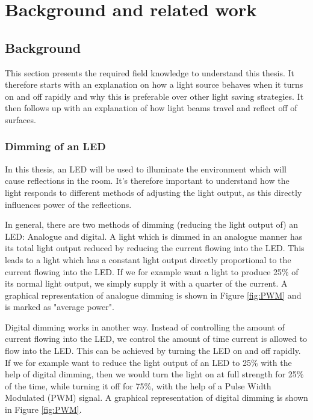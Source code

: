 \chapter{Background and related work}

\section{Background}
\label{sec:Background}
This section presents the required field knowledge to understand this thesis. It therefore starts with an explanation on how a light source behaves when it turns on and off rapidly and why this is preferable over other light saving strategies. It then follows up with an explanation of how light beams travel and reflect off of surfaces.

\subsection{Dimming of an LED}
In this thesis, an LED will be used to illuminate the environment which will cause reflections in the room. It's therefore important to understand how the light responds to different methods of adjusting the light output, as this directly influences power of the reflections.

In general, there are two methods of dimming (reducing the light output of) an LED: Analogue and digital. A light which is dimmed in an analogue manner has its total light output reduced by reducing the current flowing into the LED. This leads to a light which has a constant light output directly proportional to the current flowing into the LED. If we for example want a light to produce 25\% of its normal light output, we simply supply it with a quarter of the current. A graphical representation of analogue dimming is shown in Figure \ref{fig:PWM} and is marked as "average power".

Digital dimming works in another way. Instead of controlling the amount of current flowing into the LED, we control the amount of time current is allowed to flow into the LED. This can be achieved by turning the LED on and off rapidly. If we for example want to reduce the light output of an LED to 25\% with the help of digital dimming, then we would turn the light on at full strength for 25\% of the time, while turning it off for 75\%, with the help of a Pulse Width Modulated (PWM) signal. A graphical representation of digital dimming is shown in Figure \ref{fig:PWM}.

